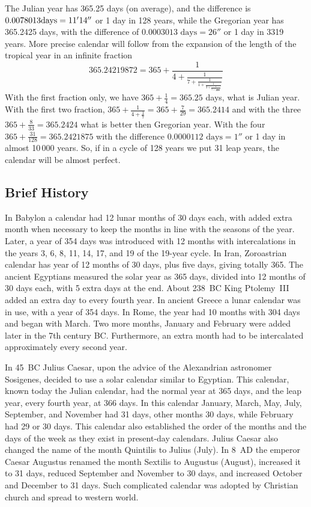 \documentclass{article}
\newcommand{\dfrac}{\displaystyle\frac}
\begin{document}
The Julian year has 365.25 days (on average), and the difference is $0.0078013 \linebreak[1]
\mbox{days}=11'14''$ or 1 day in 128 years, while the Gregorian year has 365.2425 days, with the
difference of $0.0003013 \mbox{ days} =26''$ or 1 day in 3319 years. More precise calendar will
follow from the expansion of the length of the tropical year in an infinite fraction
\[ {365.24219872}
    =365+\dfrac{1}{4+\dfrac{1}{7+\dfrac{1}{1+\dfrac{1}{3+\dfrac{1}{5+\dfrac{1}{5+\cdots}}}}}}
\]
With the first fraction only, we have $365+\frac14=365.25$ days, what is Julian year. With the
first two fraction, $365+\frac{1}{4+\frac{1}{7}}=365+\frac{7}{29}=365.2414$ and with the three
$365+\frac{8}{33}=365.2424$ what is better then Gregorian year. With the four
$365+\frac{31}{128}=365.2421875$ with the difference $0.0000112 \mbox{ days}=1''$ or 1 day in
almost 10\,000 years. So, if in a cycle of 128 years we put 31 leap years, the calendar will be
almost perfect.

\subsection*{Brief History}

In Babylon a calendar had 12 lunar months of 30 days each, with added extra month when necessary to
keep the months in line with the seasons of the year. Later, a year of 354 days was introduced with
12 months with intercalations in the years 3, 6, 8, 11, 14, 17, and 19 of the 19-year cycle. In
Iran, Zoroastrian calendar has year of 12 months of 30 days, plus five days, giving totally 365.
The ancient Egyptians measured the solar year as 365 days, divided into 12 months of 30 days each,
with 5 extra days at the end. About 238~BC King Ptolemy~III added an extra day to every fourth
year. In ancient Greece a lunar calendar was in use, with a year of 354 days. In Rome, the year had
10 months with 304 days and began with March. Two more months, January and February were added
later in the 7th century BC. Furthermore, an extra month had to be intercalated approximately every
second year.

In 45~BC Julius Caesar, upon the advice of the Alexandrian astronomer Sosigenes, decided to use a
solar calendar similar to Egyptian. This calendar, known today the Julian calendar, had the normal
year at 365 days, and the leap year, every fourth year, at 366 days. In this calendar January,
March, May, July, September, and November had 31 days, other months 30 days, while February had 29
or 30 days. This calendar also established the order of the months and the days of the week as they
exist in present-day calendars. Julius Caesar also changed the name of the month Quintilis to
Julius (July). In 8~AD the emperor Caesar Augustus renamed the month Sextilis to Augustus (August),
increased it to 31 days, reduced September and November to 30 days, and increased October and
December to 31 days. Such complicated calendar was adopted by Christian church and spread to western
world.
\end{document}
